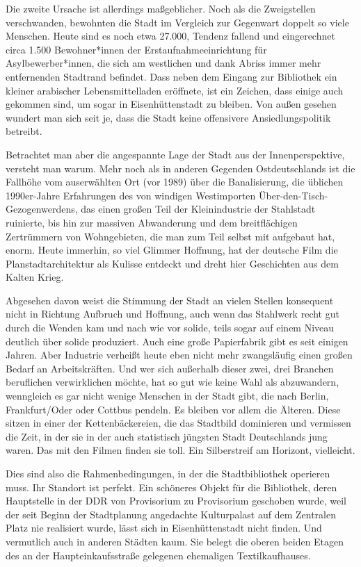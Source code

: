 \documentclass[a4paper,
fontsize=11pt,
oneside,
numbers=noperiodatend,
parskip=half-,
bibliography=totoc,
final
]{scrartcl}
\begin{document}
Die zweite Ursache ist allerdings maßgeblicher. Noch als die
Zweigstellen verschwanden, bewohnten die Stadt im Vergleich zur
Gegenwart doppelt so viele Menschen. Heute sind es noch etwa 27.000,
Tendenz fallend und eingerechnet circa 1.500 Bewohner*innen der
Erstaufnahmeeinrichtung für Asylbewerber*innen, die sich am westlichen
und dank Abriss immer mehr entfernenden Stadtrand befindet. Dass neben
dem Eingang zur Bibliothek ein kleiner arabischer Lebensmittelladen
eröffnete, ist ein Zeichen, dass einige auch gekommen sind, um sogar in
Eisenhüttenstadt zu bleiben. Von außen gesehen wundert man sich seit je,
dass die Stadt keine offensivere Ansiedlungspolitik betreibt.

Betrachtet man aber die angespannte Lage der Stadt aus der
Innenperspektive, versteht man warum. Mehr noch als in anderen Gegenden
Ostdeutschlands ist die Fallhöhe vom auserwählten Ort (vor 1989) über
die Banalisierung, die üblichen 1990er-Jahre Erfahrungen des von
windigen Westimporten Über-den-Tisch-Gezogenwerdens, das einen großen
Teil der Kleinindustrie der Stahlstadt ruinierte, bis hin zur massiven
Abwanderung und dem breitflächigen Zertrümmern von Wohngebieten, die man
zum Teil selbst mit aufgebaut hat, enorm. Heute immerhin, so viel
Glimmer Hoffnung, hat der deutsche Film die Planstadtarchitektur als
Kulisse entdeckt und dreht hier Geschichten aus dem Kalten Krieg.

Abgesehen davon weist die Stimmung der Stadt an vielen Stellen
konsequent nicht in Richtung Aufbruch und Hoffnung, auch wenn das
Stahlwerk recht gut durch die Wenden kam und nach wie vor solide, teils
sogar auf einem Niveau deutlich über solide produziert. Auch eine große
Papierfabrik gibt es seit einigen Jahren. Aber Industrie verheißt heute
eben nicht mehr zwangsläufig einen großen Bedarf an Arbeitskräften. Und
wer sich außerhalb dieser zwei, drei Branchen beruflichen verwirklichen
möchte, hat so gut wie keine Wahl als abzuwandern, wenngleich es gar
nicht wenige Menschen in der Stadt gibt, die nach Berlin, Frankfurt/Oder
oder Cottbus pendeln. Es bleiben vor allem die Älteren. Diese sitzen in
einer der Kettenbäckereien, die das Stadtbild dominieren und vermissen
die Zeit, in der sie in der auch statistisch jüngsten Stadt Deutschlands
jung waren. Das mit den Filmen finden sie toll. Ein Silberstreif am
Horizont, vielleicht.

Dies sind also die Rahmenbedingungen, in der die Stadtbibliothek
operieren muss. Ihr Standort ist perfekt. Ein schöneres Objekt für die
Bibliothek, deren Hauptstelle in der DDR von Provisorium zu Provisorium
geschoben wurde, weil der seit Beginn der Stadtplanung angedachte
Kulturpalast auf dem Zentralen Platz nie realisiert wurde, lässt sich in
Eisenhüttenstadt nicht finden. Und vermutlich auch in anderen Städten
kaum. Sie belegt die oberen beiden Etagen des an der Haupteinkaufsstraße
gelegenen ehemaligen Textilkaufhauses.
\end{document}
